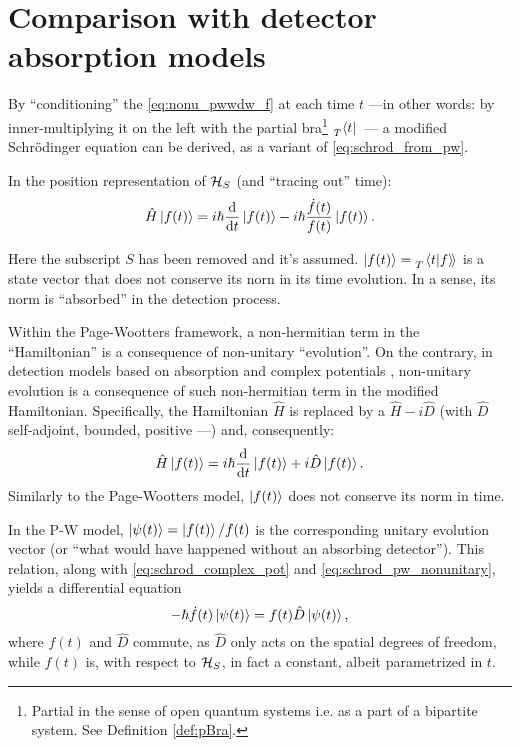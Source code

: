 \section{Comparison with detector absorption models}

By ``conditioning'' the \eqref{eq:nonu_pwwdw_f} at each time $t$
---in other words: by inner-multiplying it on the left with the partial bra\footnote{
  Partial in the sense of open quantum systems
  i.e. as a part of a bipartite system.
  See Definition \ref{def:pBra}.
}
$\prescript{}{T}{\bra{t}}$~---
a modified Schr{\"o}dinger equation
can be derived,
as a variant of \eqref{eq:schrod_from_pw}.

In the position representation of $\mathcal{H}_S$ (and ``tracing out'' time):
\begin{equation}\label{eq:schrod_pw_nonunitary}
  \hat{H} \ket{f(t)} = i\hbar\dv{t}\ket{f(t)} -i\hbar\frac{\dot{f}(t)}{f(t)}\ket{f(t)} \text{.}
\end{equation}

Here the subscript $S$ has been removed and it's assumed.
$\ket{f(t)} = \prescript{}{T}{\left.\left\langle t \middle| f \right\rangle\!\right\rangle}$
is a state vector that does not conserve its norn in its time evolution.
In a sense, its norm is ``absorbed'' in the detection process.

Within the Page-Wootters framework, a non-hermitian term in the ``Hamiltonian''
is a consequence of non-unitary ``evolution''.
On the contrary, in detection models based on absorption and complex potentials
\parencite{RuschhauptAbsorption}, non-unitary evolution is a consequence
of such non-hermitian term in the modified Hamiltonian.
Specifically, the Hamiltonian $\hat{H}$ is replaced by a $\hat{H} - i\hat{D}$
(with $\hat{D}$ self-adjoint, bounded, positive ---\cite{RuschhauptAbsorption})
and, consequently:
\begin{equation}\label{eq:schrod_complex_pot}
  \hat{H} \ket{f(t)} = i\hbar\dv{t}\ket{f(t)} +i\hat{D}\ket{f(t)} \text{.}
\end{equation}
Similarly to the Page-Wootters model, $\ket{f(t)}$ does not conserve its norm in time.

In the P-W model, $\ket{\psi(t)} = \ket{f(t)}/f(t)$
is the corresponding unitary evolution vector
(or ``what would have happened without an absorbing detector'').
This relation, along with \eqref{eq:schrod_complex_pot} and \eqref{eq:schrod_pw_nonunitary},
yields a differential equation
\begin{equation}\label{eq:phi_diffeq}
  -\hbar\dot{f}(t)\ket{\psi(t)} = f(t) \hat{D} \ket{\psi(t)} \text{,}
\end{equation}
where $f(t)$ and $\hat{D}$ commute, as $\hat{D}$ only acts on the spatial degrees of freedom,
while $f(t)$ is, with respect to $\mathcal{H}_S$, in fact a constant, albeit parametrized in $t$.

